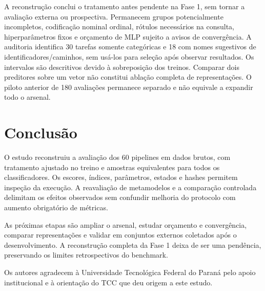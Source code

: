 \documentclass[kdmile,a4paper]{kdmile} %
\begin{document}
A reconstrução conclui o tratamento antes pendente na Fase 1, sem tornar a avaliação externa ou prospectiva. Permanecem grupos potencialmente incompletos, codificação nominal ordinal, rótulos necessários na consulta, hiperparâmetros fixos e orçamento de MLP sujeito a avisos de convergência. A auditoria identifica 30 tarefas somente categóricas e 18 com nomes sugestivos de identificadores/caminhos, sem usá-los para seleção após observar resultados. Os intervalos são descritivos devido à sobreposição dos treinos. Comparar dois preditores sobre um vetor não constitui ablação completa de representações. O piloto anterior de 180 avaliações permanece separado e não equivale a expandir todo o arsenal.

\section{Conclusão}

O estudo reconstruiu a avaliação dos 60 pipelines em dados brutos, com tratamento ajustado no treino e amostras equivalentes para todos os classificadores. Os escores, índices, parâmetros, estados e hashes permitem inspeção da execução. A reavaliação de metamodelos e a comparação controlada delimitam os efeitos observados sem confundir melhoria do protocolo com aumento obrigatório de métricas.

As próximas etapas são ampliar o arsenal, estudar orçamento e convergência, comparar representações e validar em conjuntos externos coletados após o desenvolvimento. A reconstrução completa da Fase 1 deixa de ser uma pendência, preservando os limites retrospectivos do benchmark.

\begin{ack}
Os autores agradecem à Universidade Tecnológica Federal do Paraná pelo apoio institucional e à orientação do TCC que deu origem a este estudo.
\end{ack}
\begin{received}
\end{received}


\end{document}
